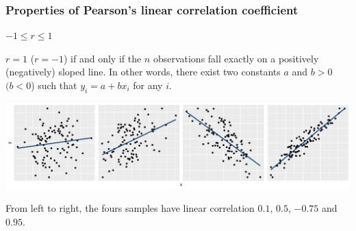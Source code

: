 \documentclass{beamer}
\begin{document}
\begin{frame}
\frametitle{Properties of Pearson's linear correlation coefficient}
\begin{tcolorbox}[colback=lightgray!30!white, colframe=lightgray!75!black, title=Properties of Pearson's linear correlation coefficient]
\bi
\item $-1 \leq r \leq 1$
\item $r=1$ ($r=-1$)  if and only if the $n$ observations fall exactly on a positively (negatively) sloped line. In other words, there exist two constants $a$ and $b > 0$ $(b <0$) such that $y_i=a+b x_i$ for any $i$.
\ei
\end{tcolorbox}
 \begin{center}
  \includegraphics[width = \textwidth]{img/c2/03-linreg-correlation}
 \end{center}
{\footnotesize 
From left to right, the fours samples have linear correlation $0.1$, $0.5$, $-0.75$ and $0.95$. 


}
 
\end{frame}
\end{document}
